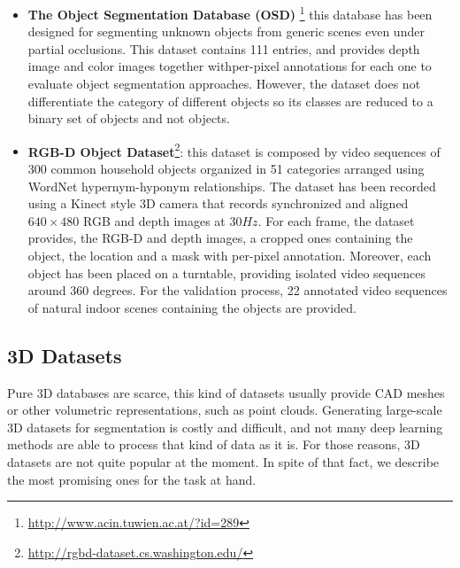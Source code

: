 \begin{itemize}
	\item \textbf{The Object Segmentation Database (OSD)}
	\cite{richtsfeld2012object}\footnote{\url{http://www.acin.tuwien.ac.at/?id=289}}
	this database has been designed for segmenting unknown objects from generic scenes even under partial occlusions. This dataset contains 111 entries, and provides depth image and color images together withper-pixel annotations for each one to evaluate object segmentation approaches. However, the dataset does not differentiate the category of different objects so its classes are reduced to a binary set of objects and not objects.

	\item \textbf{RGB-D Object Dataset}\cite{lai2011large}\footnote{\url{http://rgbd-dataset.cs.washington.edu/}}:
	this dataset is composed by video sequences of 300 common household objects organized in 51 categories arranged using WordNet hypernym-hyponym relationships. The dataset has been recorded using a Kinect style 3D camera that records synchronized and aligned $640\times480$ RGB and depth images at $30Hz$.	For each frame, the dataset provides, the RGB-D and depth images, a cropped ones containing the object, the location and a mask with per-pixel annotation. Moreover, each object has been placed on a turntable, providing isolated video sequences around 360 degrees. For the validation process, 22 annotated video sequences of natural indoor scenes containing the objects are provided.

\end{itemize}

\subsection{\acs{3D} Datasets}

Pure \acl{3D} databases are scarce, this kind of datasets usually provide \ac{CAD} meshes or other volumetric representations, such as point clouds. Generating large-scale \acs{3D} datasets for segmentation is costly and difficult, and not many deep learning methods are able to process that kind of data as it is. For those reasons, \acs{3D} datasets are not quite popular at the moment. In spite of that fact, we describe the most promising ones for the task at hand.

